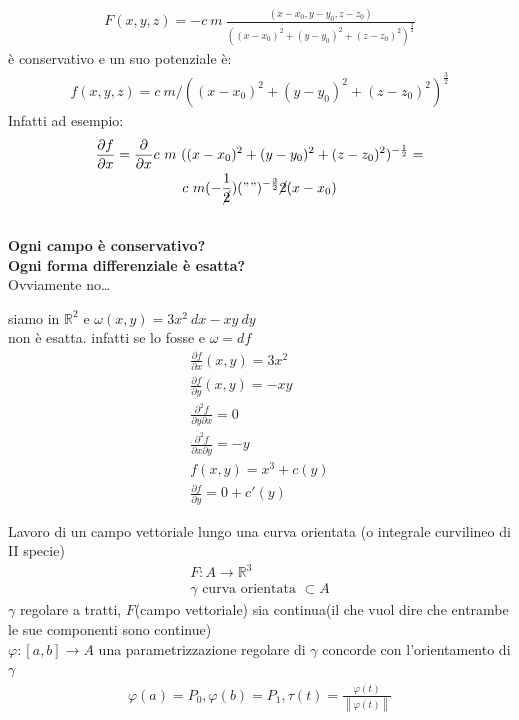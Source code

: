 \documentclass[a4paper, oneside]{article}
\begin{document}
\begin{example}
\begin{gather*}
    F(x,y,z) = -c \ m \ \frac{(x-x_0,y-y_0,z-z_0)}{((x-x_0)^2+(y-y_0)^2+(z-z_0)^2)^{\frac{3}{2}}}
\end{gather*}
è conservativo e un suo potenziale è:
\begin{gather*}
    f(x,y,z) = c \ m / ((x-x_0)^2+(y-y_0)^2+(z-z_0)^2)^{\frac{3}{2}}
\end{gather*}
Infatti ad esempio:
\begin{gather*}
    \frac{\partial f}{\partial x} = \frac{\partial }{\partial x} c \ m \ ((x-x_0)^2+(y-y_0)^2+(z-z_0)^2)^{-\frac{1}{2}}=\\
    c \ m (-\frac{1}{\cancel{2}})("")^{-\frac{3}{2}} \cancel{2} (x-x_0)
\end{gather*}
\end{example}
\hfil\\
\textbf{Ogni campo è conservativo?}\\
\textbf{Ogni forma differenziale è esatta?}\\
Ovviamente no\dots
\begin{example}
    siamo in $\mathbb{R}^2$ e  $\omega(x,y) = 3x^2 \ dx -xy \ dy$\\
    non è esatta. infatti se lo fosse e $\omega = df$
    \begin{gather*}
            \frac{\partial f}{\partial x}(x,y) = 3x^2\\
            \frac{\partial f}{\partial y}(x,y) = -xy\\
            \frac{\partial^2 f}{\partial y \partial x} = 0\\
                \frac{\partial^2 f}{\partial x \partial y} = -y\\
            f(x,y) = x^3+c(y)\\
            \frac{\partial f}{\partial y} = 0 + c'(y)
    \end{gather*}
\end{example}
\begin{proposition}
    Lavoro di un campo vettoriale lungo una curva orientata (o integrale curvilineo di II specie)
    \begin{gather*}
        F:A \to \mathbb{R}^3\\
        \gamma \text{ curva orientata } \subset A
    \end{gather*}
     $\gamma$ regolare a tratti, $F$(campo vettoriale) sia continua(il che vuol dire che entrambe le sue componenti sono continue)\\
    $\varphi:[a,b] \to A$ una parametrizzazione regolare di $\gamma$ concorde con l'orientamento di $\gamma$\\
    \begin{gather*}
        \varphi(a) = P_0 , \varphi(b) = P_1, \tau(t) = \frac{\dot{\varphi(t)}}{\left\lVert \dot{\varphi(t)} \right\rVert }
    \end{gather*}
\end{proposition}
\end{document}
